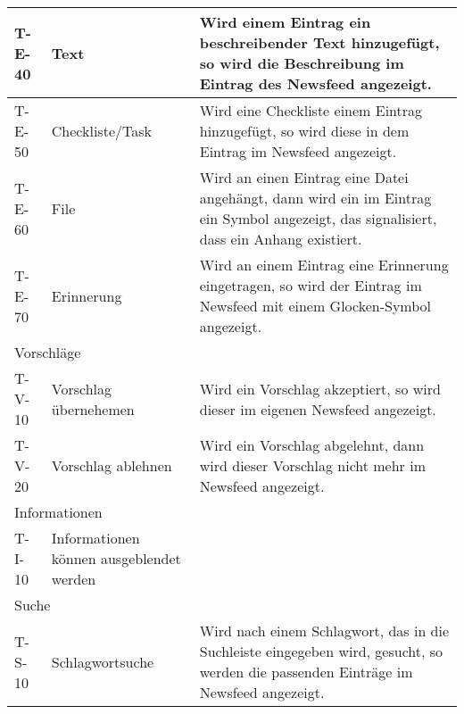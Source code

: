 \begin{tabularx}{\textwidth}{|l|X|X|}
    T-E-40 & Text & Wird einem Eintrag ein beschreibender Text hinzugefügt, so wird die Beschreibung im Eintrag des Newsfeed angezeigt. \\ \hline
    T-E-50 & Checkliste/Task & Wird eine Checkliste einem Eintrag hinzugefügt, so wird diese in dem Eintrag im Newsfeed angezeigt. \\ \hline
    T-E-60 & File & Wird an einen Eintrag eine Datei angehängt, dann wird ein im Eintrag ein Symbol angezeigt, das signalisiert, dass ein Anhang existiert. \\ \hline
 	T-E-70 & Erinnerung & Wird an einem Eintrag eine Erinnerung eingetragen, so wird der Eintrag im Newsfeed mit einem Glocken-Symbol angezeigt.\\ \hline
    \multicolumn{3}{|l|}{Vorschläge}\\ \hline
    T-V-10 & Vorschlag übernehemen  & Wird ein Vorschlag akzeptiert, so wird dieser im eigenen Newsfeed angezeigt. \\ \hline
    T-V-20 & Vorschlag ablehnen & Wird ein Vorschlag abgelehnt, dann wird dieser Vorschlag nicht mehr im Newsfeed angezeigt. \\ \hline
    \multicolumn{3}{|l|}{Informationen}\\\hline
    
    T-I-10 & Informationen können ausgeblendet werden & \\ \hline
	\multicolumn{3}{|l|}{Suche}\\ \hline
	T-S-10 & Schlagwortsuche  & Wird nach einem Schlagwort, das in die Suchleiste eingegeben wird, gesucht, so werden die passenden Einträge im Newsfeed angezeigt.\\  

    
  
	
 
  
\end{tabularx}



